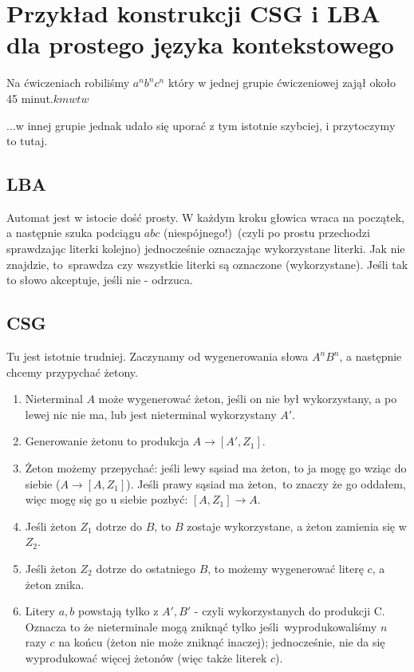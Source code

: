 \section{Przykład konstrukcji CSG i LBA dla prostego języka kontekstowego}

Na ćwiczeniach robiliśmy \( a^nb^nc^n\) który w jednej grupie ćwiczeniowej zajął około 45 minut.\( kmwtw\)

...w innej grupie jednak udało się uporać z tym istotnie szybciej, i przytoczymy to tutaj.

\subsection{LBA}

Automat jest w istocie dość prosty. W każdym kroku głowica wraca na początek, a następnie szuka podciągu \(abc\) (niespójnego!)\
(czyli po prostu przechodzi sprawdzając literki kolejno) jednocześnie oznaczając wykorzystane literki. Jak nie znajdzie, to\
sprawdza czy wszystkie literki są oznaczone (wykorzystane). Jeśli tak to słowo akceptuje, jeśli nie - odrzuca.

\subsection{CSG}

Tu jest istotnie trudniej. Zaczynamy od wygenerowania słowa \(A^nB^n\), a następnie chcemy przypychać żetony.

\begin{enumerate}
	\item Nieterminal \(A\) może wygenerować żeton, jeśli on nie był wykorzystany, a po lewej nic nie ma, lub jest nieterminal wykorzystany \(A'\).
	\item Generowanie żetonu to produkcja \(A \rightarrow [A', Z_1]\).
	\item Żeton możemy przepychać: jeśli lewy sąsiad ma żeton, to ja mogę go wziąc do siebie (\(A \rightarrow [A, Z_1]\)). Jeśli prawy sąsiad ma żeton,\
	      to znaczy że go oddałem, więc mogę się go u siebie pozbyć: \([A, Z_1] \rightarrow A\).
	\item Jeśli żeton \(Z_1\) dotrze do \(B\), to \(B\) zostaje wykorzystane, a żeton zamienia się w \(Z_2\).
	\item Jeśli żeton \(Z_2\) dotrze do ostatniego \(B\), to możemy wygenerować literę \(c\), a żeton znika.
	\item Litery \(a, b\) powstają tylko z \(A', B'\) - czyli wykorzystanych do produkcji C. Oznacza to że nieterminale mogą zniknąć tylko jeśli\
	      wyprodukowaliśmy \(n\) razy \(c\) na końcu (żeton nie może zniknąć inaczej); jednocześnie, nie da się wyprodukować więcej żetonów (więc także literek \(c\)).
\end{enumerate}
